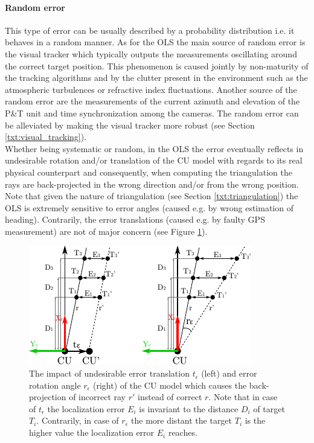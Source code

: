 \paragraph{Random error} This type of error can be usually described by a probability distribution i.e. it behaves in a random manner. As for the OLS the main source of random error is the visual tracker which typically outputs the measurements oscillating around the correct target position. This phenomenon is caused jointly by non-maturity of the tracking algorithms and by the clutter present in the environment such as the atmospheric turbulences or refractive index fluctuations. Another source of the random error are the measurements of the current azimuth and elevation of the P\&T unit and time synchronization among the cameras. The random error can be alleviated by making the visual tracker more robust (see Section \ref{txt:visual_tracking}).\\

Whether being systematic or random, in the OLS the error eventually reflects in undesirable rotation and/or translation of the CU model with regards to its real physical counterpart and consequently, when computing the triangulation the rays are back-projected in the wrong direction and/or from the wrong position. Note that given the nature of triangulation (see Section \ref{txt:triangulation}) the OLS is extremely sensitive to error angles (caused e.g. by wrong estimation of heading). Contrarily, the error translations (caused e.g. by faulty GPS measurement) are not of major concern (see Figure \ref{fig:rotation_vs_translation}).

\begin{figure}[htb]\centering
	\centering
	\includegraphics[width=0.55\linewidth]{fig/rotation_vs_translation.pdf}
	\caption{The impact of undesirable error translation $t_{\epsilon}$ (left) and error rotation angle $r_{\epsilon}$ (right) of the CU model which causes the back-projection of incorrect ray $r'$ instead of correct $r$. Note that in case of $t_{\epsilon}$ the localization error $E_{i}$ is invariant to the distance $D_{i}$ of target $T_{i}$. Contrarily, in case of $r_{\epsilon}$ the more distant the target $T_{i}$ is the higher value the localization error $E_{i}$ reaches.}
	\label{fig:rotation_vs_translation}
\end{figure}

